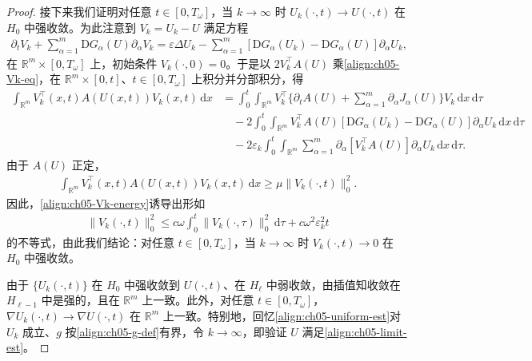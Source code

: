 \documentclass[../../main.tex]{subfiles}
\begin{document}
\begin{proof}
接下来我们证明对任意 $t\in[0,T_{\omega}]$，当 $k\to\infty$ 时 $U_{k}(\cdot,t)\to U(\cdot,t)$ 在 $H_{0}$ 中强收敛。为此注意到 $V_{k}=U_{k}-U$ 满足方程
\begin{align}
\partial_{t}V_{k}+\sum_{\alpha=1}^{m}\mathrm{D}G_{\alpha}(U)\partial_{\alpha}V_{k}=\varepsilon\Delta U_{k}-\sum_{\alpha=1}^{m}[\mathrm{D}G_{\alpha}(U_{k})-\mathrm{D}G_{\alpha}(U)]\partial_{\alpha}U_{k},\label{align:ch05-Vk-eq}
\end{align}
在 $\mathbb{R}^{m}\times[0,T_{\omega}]$ 上，初始条件 $V_{k}(\cdot,0)=0$。于是以 $2V_{k}^{\top}A(U)$ 乘\eqref{align:ch05-Vk-eq}，在 $\mathbb{R}^{m}\times[0,t]$、$t\in[0,T_{\omega}]$ 上积分并分部积分，得
\begin{align}
\int_{\mathbb{R}^{m}}V_{k}^{\top}(x,t)A(U(x,t))V_{k}(x,t)\,\mathrm{d}x
&=\int_{0}^{t}\int_{\mathbb{R}^{m}}V_{k}^{\top}\{\partial_{t}A(U)+\sum_{\alpha=1}^{m}\partial_{\alpha}J_{\alpha}(U)\}V_{k}\,\mathrm{d}x\,\mathrm{d}\tau\nonumber\\
&\quad-2\int_{0}^{t}\int_{\mathbb{R}^{m}}V_{k}^{\top}A(U)[\mathrm{D}G_{\alpha}(U_{k})-\mathrm{D}G_{\alpha}(U)]\partial_{\alpha}U_{k}\,\mathrm{d}x\,\mathrm{d}\tau\nonumber\\
&\quad-2\varepsilon_{k}\int_{0}^{t}\int_{\mathbb{R}^{m}}\sum_{\alpha=1}^{m}\partial_{\alpha}[V_{k}^{\top}A(U)]\partial_{\alpha}U_{k}\,\mathrm{d}x\,\mathrm{d}\tau.\label{align:ch05-Vk-energy}
\end{align}
由于 $A(U)$ 正定，
\begin{align}
\int_{\mathbb{R}^{m}}V_{k}^{\top}(x,t)A(U(x,t))V_{k}(x,t)\,\mathrm{d}x\geqslant\mu\|V_{k}(\cdot,t)\|_{0}^{2}.\label{align:ch05-Vk-positive}
\end{align}
因此，\eqref{align:ch05-Vk-energy}诱导出形如
\begin{align}
\|V_{k}(\cdot,t)\|_{0}^{2}\leqslant c\omega\int_{0}^{t}\|V_{k}(\cdot,\tau)\|_{0}^{2}\,\mathrm{d}\tau+c\omega^{2}\varepsilon_{k}^{2}t\label{align:ch05-Vk-Gronwall}
\end{align}
的不等式，由此我们结论：对任意 $t\in[0,T_{\omega}]$，当 $k\to\infty$ 时 $V_{k}(\cdot,t)\to0$ 在 $H_{0}$ 中强收敛。

由于 $\{U_{k}(\cdot,t)\}$ 在 $H_{0}$ 中强收敛到 $U(\cdot,t)$、在 $H_{\ell}$ 中弱收敛，由插值知收敛在 $H_{\ell-1}$ 中是强的，且在 $\mathbb{R}^{m}$ 上一致。此外，对任意 $t\in[0,T_{\omega}]$，$\nabla U_{k}(\cdot,t)\to\nabla U(\cdot,t)$ 在 $\mathbb{R}^{m}$ 上一致。特别地，回忆\eqref{align:ch05-uniform-est}对 $U_{k}$ 成立、$g$ 按\eqref{align:ch05-g-def}有界，令 $k\to\infty$，即验证 $U$ 满足\eqref{align:ch05-limit-est}。


\end{proof}
\end{document}

